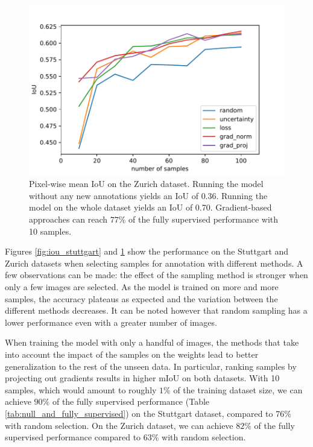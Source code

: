 \documentclass[letterpaper, 10 pt, conference]{ieeeconf}  %
\begin{document}
    \begin{figure}
    \centering
    \includegraphics[width=\linewidth]{pics/pw_iou_zurich.pdf}
   		\caption{Pixel-wise mean IoU on the Zurich dataset. Running the model without any new annotations yields an IoU of $0.36$. Running the model on the whole dataset yields an IoU of 0.70. Gradient-based approaches can reach $77\%$ of the fully supervised performance with 10 samples.}
		\label{fig:iou_zurich}    		
   \end{figure}
   
   
 
Figures \ref{fig:iou_stuttgart} and \ref{fig:iou_zurich} show the performance on the Stuttgart and Zurich datasets when selecting samples for annotation with different methods.  
A few observations can be made: the effect of the sampling method is stronger when only a few images are selected. As the model is trained on more and more samples, the accuracy plateaus as expected and the variation between the different methods decreases. It can be noted however that random sampling has a lower performance even with a greater number of images.

When training the model with only a handful of images, the methods that take into account the impact of the samples on the weights lead to better generalization to the rest of the unseen data. In particular, ranking samples by projecting out gradients results in higher mIoU on both datasets. With 10 samples, which would amount to roughly $1\%$ of the training dataset size, we can achieve $90\%$ of the fully supervised performance (Table \ref{tab:null_and_fully_supervised}) on the Stuttgart dataset, compared to $76\%$ with random selection. On the Zurich dataset, we can achieve $82\%$ of the fully supervised performance compared to $63\%$ with random selection.
\end{document}
